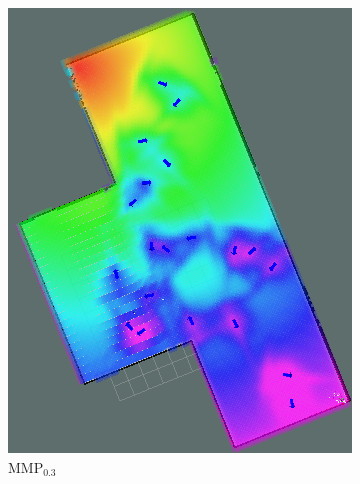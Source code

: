 \documentclass[a4paper,11pt]{report}
\begin{document}
\begin{figure}[tbh]
\begin{subfigure}[b]{0.30\columnwidth}
    \includegraphics[width=1.\textwidth]{figures/astar03.png}
    \caption{MMP$_{0.3}$}
    \label{fig:astar03_cf}
   \end{subfigure}
  \begin{subfigure}[b]{0.305\columnwidth}

\end{subfigure}
\end{figure}
\end{document}
